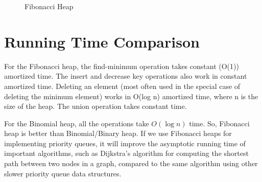 \documentclass[14pt,a4paper]{report}
\begin{document}
\begin{figure}[h]
    \centering
    
    
    \caption{Fibonacci Heap}
    \label{fig:my_label}
\end{figure}

\section{Running Time Comparison}
For the Fibonacci heap, the find-minimum operation takes constant (O(1)) amortized time. The insert and decrease key operations also work in constant amortized time. Deleting an element (most often used in the special case of deleting the minimum element) works in O(log n) amortized time, where n is the size of the heap. The union operation takes constant time. \par
For the Binomial heap, all the operations take $O(\log{n})$ time. So, Fibonacci heap is better than Binomial/Binary heap. If we use Fibonacci heaps for implementing priority queues, it will improve the asymptotic running time of important algorithms, such as Dijkstra's algorithm for computing the shortest path between two nodes in a graph, compared to the same algorithm using other slower priority queue data structures.
\end{document}
